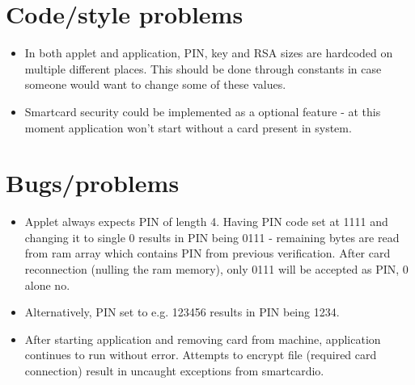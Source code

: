 \documentclass[letterpaper]{article}
\begin{document}
\section{Code/style problems}
\begin{itemize}
\item In both applet and application, PIN, key and RSA sizes are hardcoded on multiple different places. This should be done through constants in case someone would want to change some of these values.
\item Smartcard security could be implemented as a optional feature - at this moment application won't start without a card present in system.
\end{itemize}

\section{Bugs/problems}
\begin{itemize}
\item Applet always expects PIN of length 4. Having PIN code set at 1111 and changing it to single 0 results in PIN being 0111 - remaining bytes are read from ram array which contains PIN from previous verification. After card reconnection (nulling the ram memory), only 0111 will be accepted as PIN, 0 alone no.
\item Alternatively, PIN set to e.g. 123456 results in PIN being 1234.
\item After starting application and removing card from machine, application continues to run without error. Attempts to encrypt file (required card connection) result in uncaught exceptions from smartcardio.
\end{itemize}
\end{document}
